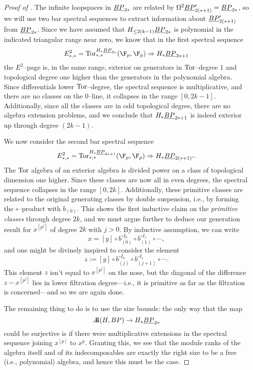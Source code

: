 \begin{proof}[{Proof of }]
The infinite loopspaces in $\underline{\smash{BP}}_{2*}$ are related by $\Omega^2 \underline{\smash{BP}}_{2(*+1)}' = \underline{\smash{BP}}_{2*}$, so we will use two bar spectral sequences to extract information about $\underline{\smash{BP}}_{2(*+1)}'$ from $\underline{\smash{BP}}_{2*}$.  Since we have assumed that $H_{\le 2(k-1)} \underline{\smash{BP}}_{2*}$ is polynomial in the indicated triangular range near zero, we know that in the first spectral sequence \[E^2_{*, *} = \Tor^{H_* \OS{BP}{2*}}_{*, *}(\F_p, \F_p) \Rightarrow H_* \OS{BP}{2*+1}\] the $E^2$--page is, in the same range, exterior on generators in $\operatorname{Tor}$--degree $1$ and topological degree one higher than the generators in the polynomial algebra.  Since differentials lower $\operatorname{Tor}$--degree, the spectral sequence is multiplicative, and there are no classes on the $0$--line, it collapses in the range $[0, 2k-1]$.  Additionally, since all the classes are in odd topological degree, there are no algebra extension problems, and we conclude that $H_* \underline{\smash{BP}}_{2*+1}$ is indeed exterior up through degree $(2k-1)$.

We now consider the second bar spectral sequence \[E^2_{*, *} = \Tor^{H_* \OS{BP}{2*+1}}_{*, *}(\F_p, \F_p) \Rightarrow H_* \OS{BP}{2(*+1)'}.\]  The $\operatorname{Tor}$ algebra of an exterior algebra is divided power on a class of topological dimension one higher.  Since these classes are now all in even degrees, the spectral sequence collapses in the range $[0, 2k]$.  Additionally, these primitive classes are related to the original generating classes by double suspension, i.e., by forming the $\circ$--product with $b_{(0)}$.  This shows the first inductive claim on the \emph{primitive classes} through degree $2k$, and we must argue further to deduce our generation result for $x^{[p^j]}$ of degree $2k$ with $j > 0$.  By inductive assumption, we can write \[x = [y] \circ b_{(0)}^{\circ I_0} \circ b_{(1)}^{\circ I_1} \circ \cdots,\] and one might be divinely inspired to consider the element \[z := [y] \circ b_{(j)}^{\circ I_0} \circ b_{(j+1)}^{\circ I_1} \circ \cdots.\]  This element $z$ isn't equal to $x^{[p^j]}$ on the nose, but the diagonal of the difference $z - x^{[p^j]}$ lies in lower filtration degree---i.e., it is primitive as far as the filtration is concerned---and so we are again done.

The remaining thing to do is to use the size bounds: the only way that the map \[A\!\!\!A(H, BP) \to H_* \underline{\smash{BP}}_{2*}\] could be surjective is if there were multiplicative extensions in the spectral sequence joining $x^{[p]}$ to $x^p$.  Granting this, we see that the module ranks of the algebra itself and of its indecomposables are exactly the right size to be a free (i.e., polynomial) algebra, and hence this must be the case.
\end{proof}

